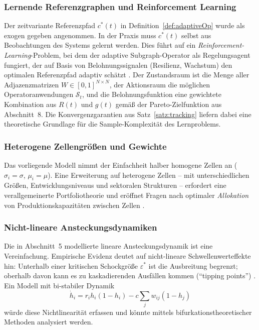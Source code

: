 ﻿\documentclass[a4paper,12pt]{article}
\theoremstyle{definition}
\begin{document}
\subsubsection{Lernende Referenzgraphen und Reinforcement Learning}

Der zeitvariante Referenzpfad $c^*(t)$ in Definition~\ref{def:adaptiveOp} wurde
als exogen gegeben angenommen. In der Praxis muss $c^*(t)$ selbst aus Beobachtungen
des Systems gelernt werden. Dies führt auf ein \emph{Reinforcement-Learning}-Problem,
bei dem der adaptive Subgraph-Operator als Regelungsagent fungiert, der auf Basis
von Belohnungssignalen (Resilienz, Wachstum) den optimalen Referenzpfad adaptiv
schätzt \citep{sutton2018reinforcement}. Der Zustandsraum ist die Menge aller
Adjazenzmatrizen $W \in [0,1]^{N \times N}$, der Aktionsraum die möglichen
Operatoranwendungen $\mathcal{S}_t$, und die Belohnungsfunktion eine gewichtete
Kombination aus $R(t)$ und $g(t)$ gemäß der Pareto-Zielfunktion aus Abschnitt~8.
Die Konvergenzgarantien aus Satz~\ref{satz:tracking} liefern dabei eine
theoretische Grundlage für die Sample-Komplexität des Lernproblems.

\subsubsection{Heterogene Zellengrößen und Gewichte}

Das vorliegende Modell nimmt der Einfachheit halber homogene Zellen an ($\sigma_i = \sigma$,
$\mu_i = \mu$). Eine Erweiterung auf heterogene Zellen -- mit unterschiedlichen Größen,
Entwicklungsniveaus und sektoralen Strukturen -- erfordert eine verallgemeinerte
Portfoliotheorie und eröffnet Fragen nach optimaler \emph{Allokation} von Produktionskapazitäten
zwischen Zellen \citep{markowitz1952portfolio}.

\subsubsection{Nicht-lineare Ansteckungsdynamiken}

Die in Abschnitt~5 modellierte lineare Ansteckungsdynamik ist eine Vereinfachung.
Empirische Evidenz deutet auf nicht-lineare Schwellenwerteffekte hin: Unterhalb einer
kritischen Schockgröße $\varepsilon^*$ ist die Ausbreitung begrenzt; oberhalb davon
kann es zu kaskadierenden Ausfällen kommen (``tipping points'') \citep{may2008complex}.
Ein Modell mit bi-stabiler Dynamik
\[
    \dot{h}_i = r_i h_i (1-h_i) - c \sum_j w_{ij}(1-h_j)
\]
würde diese Nichtlinearität erfassen und könnte mittels bifurkationstheoretischer Methoden
analysiert werden.
\end{document}
